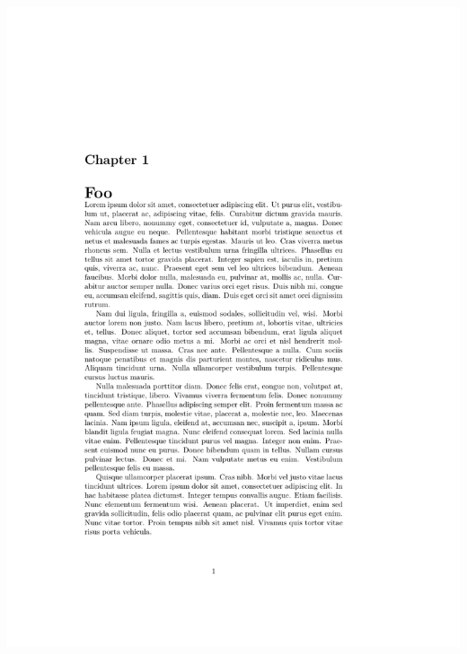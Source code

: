 \documentclass{beamer}
\begin{document}
\begin{frame}[fragile]
\begin{overprint}
\begin{columns}
      \begin{column}{0.5\textwidth}
        \begin{latexcode}
          \setlength\afterchapskip{0pt}
        \end{latexcode}
        \begin{center}
          \includegraphics[frame,page=1,width=0.8\linewidth]{afterchaptertitle-2}
        \end{center}
      \end{column}
    \end{columns}


\end{overprint}
\end{frame}
\end{document}
